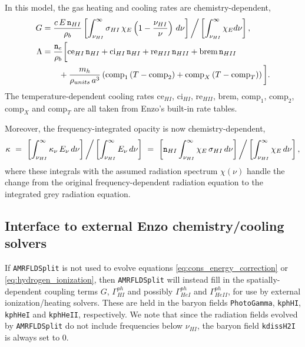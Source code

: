 \documentclass[letterpaper,10pt]{article}
\renewcommand{\(}{\left(}
\renewcommand{\)}{\right)}
\newcommand{\rhob}{\rho_b}
\newcommand{\mn}{{\tt n}}
\begin{document}
In this model, the gas heating and cooling rates are
chemistry-dependent, 
\begin{align}
  \label{eq:G_nLTE}
  G &= \frac{c\,E\,\mn_{HI}}{\rhob} 
    \left[\int_{\nu_{HI}}^{\infty} \sigma_{HI}\, \chi_E
    \left(1-\frac{\nu_{HI}}{\nu}\right)\, d\nu\right] \bigg/
    \left[\int_{\nu_{HI}}^{\infty} \chi_E d\nu\right], \\
\label{eq:Lambda_nLTE}
  \Lambda &= \frac{\mn_e}{\rhob}\bigg[\text{ce}_{HI}\, \mn_{HI} 
  + \text{ci}_{HI}\, \mn_{HI} + \text{re}_{HII}\, \mn_{HII} + \text{brem}\,
  \mn_{HII} \\
  \notag &\qquad+ \frac{m_h}{\rho_{units}\, a^3} \left(\text{comp}_1\, (T-\text{comp}_2) 
    + \text{comp}_{X}\, (T-\text{comp}_{T})\right) \bigg].
\end{align}
The temperature-dependent cooling rates
$\text{ce}_{HI}$, $\text{ci}_{HI}$, $\text{re}_{HII}$, $\text{brem}$,
$\text{comp}_1$, $\text{comp}_2$, $\text{comp}_{X}$ and
$\text{comp}_{T}$ are all taken from Enzo's built-in rate tables.

Moreover, the frequency-integrated opacity is now chemistry-dependent,
\begin{equation}
\label{eq:opacityHI}
  \kappa \ = \ 
  \left[\int_{\nu_{HI}}^{\infty} \kappa_{\nu}\,E_{\nu}\,d\nu\right] \bigg/
  \left[\int_{\nu_{HI}}^{\infty} E_{\nu}\,d\nu\right] \ = \ 
  \left[\mn_{HI} \int_{\nu_{HI}}^{\infty}
    \chi_E\,\sigma_{HI}\,d\nu\right] \bigg/
  \left[\int_{\nu_{HI}}^{\infty} \chi_E\,d\nu\right],
\end{equation}
where these integrals with the assumed radiation spectrum $\chi(\nu)$
handle the change from the original frequency-dependent radiation
equation to the integrated grey radiation equation.



\subsection{Interface to external Enzo chemistry/cooling solvers}
\label{sec:chem_model_external}

If {\tt AMRFLDSplit} is not used to evolve equations
\eqref{eq:cons_energy_correction} or \eqref{eq:hydrogen_ionization},
then {\tt AMRFLDSplit} will instead fill in the spatially-dependent
coupling terms $G$, $\Gamma_{HI}^{ph}$ and possibly
$\Gamma_{HeI}^{ph}$ and $\Gamma_{HeII}^{ph}$, for use by external
ionization/heating solvers.  These are held in the baryon fields 
{\tt PhotoGamma}, {\tt kphHI}, {\tt kphHeI} and {\tt kphHeII},
respectively.  We note that since the radiation fields evolved by 
{\tt AMRFLDSplit} do not include frequencies below $\nu_{HI}$, the
baryon field {\tt kdissH2I} is always set to 0.
\end{document}

